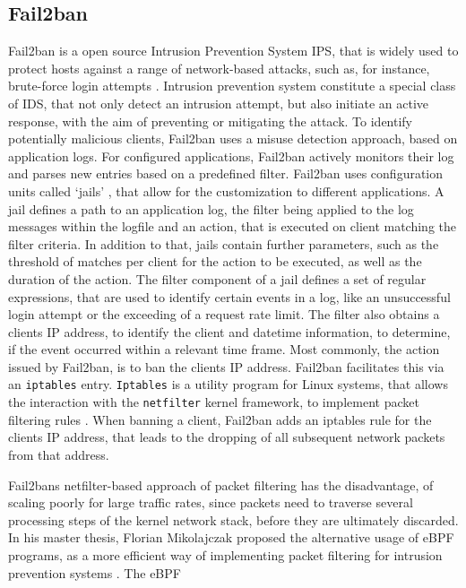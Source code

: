 \subsection{Fail2ban} \label{sec:fail2ban}

Fail2ban is a open source Intrusion Prevention System \ac{IPS}, that is widely used to protect hosts against a range of network-based attacks, such as, for instance, brute-force login attempts \cite{fail2ban}. Intrusion prevention system constitute
a special class of \ac{IDS}, that not only detect an intrusion attempt, but also initiate an active response, with the aim of preventing or mitigating the attack. To identify potentially malicious clients,
Fail2ban uses a misuse detection approach, based on application logs. For configured applications, Fail2ban actively monitors their log and parses new entries based on a predefined filter. Fail2ban uses configuration units called `jails'  
, that allow for the customization to different applications. A jail defines a path to an application log, the filter being applied to the log messages within the logfile and an action, that
is executed on client matching the filter criteria. In addition to that, jails contain further parameters, such as the threshold of matches per client for the action to be executed,
as well as the duration of the action. The filter component of a jail defines a set of regular expressions, that are used to identify certain events in a log, like an unsuccessful login attempt or the 
exceeding of a request rate limit. The filter also obtains a clients IP address, to identify the client and datetime information, to determine, if the event occurred within a relevant time frame. 
Most commonly, the action issued by Fail2ban, is to ban the clients IP address. Fail2ban facilitates this via an \texttt{iptables} entry. 
\texttt{Iptables} is a utility program for Linux systems, that allows the interaction with the \texttt{netfilter} kernel framework, to implement packet filtering rules \cite{netfiler,iptables}. When banning a client, Fail2ban adds an iptables rule for the clients IP address, that leads 
to the dropping of all subsequent network packets from that address.
\par
Fail2bans netfilter-based approach of packet filtering has the disadvantage, of scaling poorly for large traffic rates, since packets need to traverse several processing steps of the kernel network stack, before they are ultimately discarded.
In his master thesis, Florian Mikolajczak proposed the alternative usage of eBPF programs, as a more efficient way of implementing packet filtering for intrusion prevention systems \cite{mikolajczak2022}. The \ac{eBPF}      
